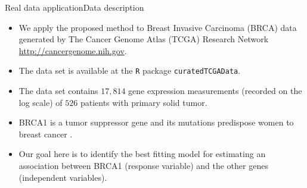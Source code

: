 \documentclass[citecolor=blue,10pt]{beamer}
\newcommand{\0} {\mbox{\boldmath$0$}}
\begin{document}
\begin{frame}{Real data application}{Data description}
\begin{itemize}\itemsep=4mm
\item We apply the proposed method to Breast Invasive Carcinoma (BRCA) data generated by The Cancer Genome Atlas (TCGA) Research Network \url{http://cancergenome.nih.gov}. 
\item The data set is available at the \texttt{R} package \texttt{curatedTCGAData}. 
\item The data set contains $17,814$ gene expression measurements (recorded on the log scale) of $526$ patients with primary solid tumor. 
\item BRCA1 is a tumor suppressor gene and its mutations predispose women to breast cancer \citep{findlay2018accurate}. 
\item Our goal here is to identify the best fitting model for estimating an association between BRCA1 (response variable) and the other genes (independent variables). 

\end{itemize}
\end{frame}
\end{document}
